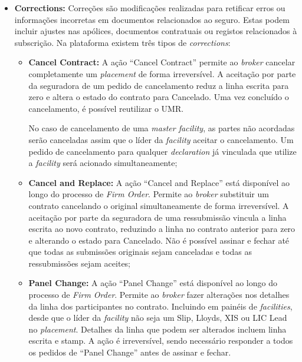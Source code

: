 \begin{itemize}
            \item \textbf{Corrections:} Correções são modificações realizadas para retificar erros ou informações incorretas em documentos relacionados ao seguro. Estas podem incluir ajustes nas apólices, documentos contratuais ou registos relacionados à subscrição. Na plataforma existem três tipos de \textit{corrections}:
            \begin{itemize}

                 \item \textbf{Cancel Contract:}
                 A ação ``Cancel Contract'' permite ao \textit{broker} cancelar completamente um \textit{placement} de forma irreversível. A aceitação por parte da seguradora de um pedido de cancelamento reduz a linha escrita para zero e altera o estado do contrato para Cancelado. Uma vez concluído o cancelamento, é possível reutilizar o UMR. 
                 
                 No caso de cancelamento de uma \textit{master facility}, as partes não acordadas serão canceladas assim que o líder da \textit{facility} aceitar o cancelamento. Um pedido de cancelamento para qualquer \textit{declaration} já vinculada que utilize a \textit{facility} será acionado simultaneamente;
                 
                 \item \textbf{Cancel and Replace:}
                 A ação ``Cancel and Replace'' está disponível ao longo do processo de \textit{Firm Order}. Permite ao \textit{broker} substituir um contrato cancelando o original simultaneamente de forma irreversível. A aceitação por parte da seguradora de uma ressubmissão vincula a linha escrita ao novo contrato, reduzindo a linha no contrato anterior para zero e alterando o estado para Cancelado. Não é possível assinar e fechar até que todas as submissões originais sejam canceladas e todas as ressubmissões sejam aceites;
                 
                 \item \textbf{Panel Change:}
                 A ação ``Panel Change'' está disponível ao longo do processo de \textit{Firm Order}. Permite ao \textit{broker} fazer alterações nos detalhes da linha dos participantes no contrato. Incluindo em painéis de \textit{facilities}, desde que o líder da \textit{facility} não seja um Slip, Lloyds, XIS ou LIC Lead no \textit{placement}. Detalhes da linha que podem ser alterados incluem linha escrita e stamp. A ação é irreversível, sendo necessário responder a todos os pedidos de ``Panel Change'' antes de assinar e fechar.
            \end{itemize}           


\end{itemize}
